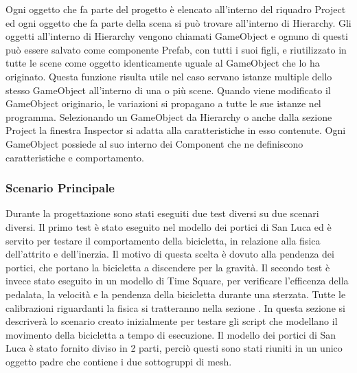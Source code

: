 Ogni oggetto che fa parte del progetto è elencato all’interno del riquadro Project ed ogni oggetto che fa parte della scena si può trovare all’interno di Hierarchy. Gli oggetti all’interno di Hierarchy vengono chiamati GameObject e ognuno di questi può essere salvato come componente Prefab, con tutti i suoi figli, e riutilizzato in tutte le scene come oggetto identicamente uguale al GameObject che lo ha originato. Questa funzione risulta utile nel caso servano istanze multiple dello stesso GameObject all’interno di una o più scene. Quando viene modificato il GameObject originario, le variazioni si propagano a tutte le sue istanze nel programma. Selezionando un GameObject da Hierarchy o anche dalla sezione Project la finestra Inspector si adatta alla caratteristiche in esso contenute. Ogni GameObject possiede al suo interno dei Component che ne definiscono caratteristiche e comportamento.

\subsubsection{Scenario Principale}
Durante la progettazione sono stati eseguiti due test diversi su due scenari diversi. Il primo test è stato eseguito nel modello dei portici di San Luca ed è servito per testare il comportamento della bicicletta, in relazione alla fisica dell'attrito e dell'inerzia. Il motivo di questa scelta è dovuto alla pendenza dei portici, che portano la bicicletta a discendere per la gravità. Il secondo test è invece stato eseguito in un modello di Time Square, per verificare l'efficenza della pedalata, la velocità e la pendenza della bicicletta durante una sterzata. Tutte le calibrazioni riguardanti la fisica si tratteranno nella sezione \textit{}. In questa sezione si descriverà lo scenario creato inizialmente per testare gli script che modellano il movimento della bicicletta a tempo di esecuzione. 
Il modello dei portici di San Luca è stato fornito diviso in 2 parti, perciò questi sono stati riuniti in un unico oggetto padre che contiene i due sottogruppi di mesh. 




